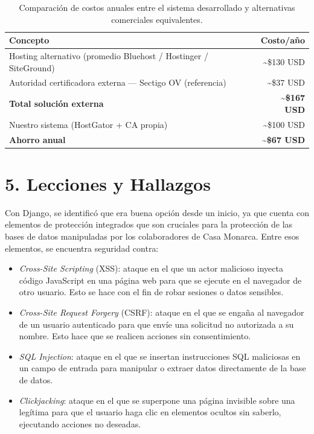 \documentclass[10pt,letterpaper]{report}
\begin{document}
\begin{table}[H]
\centering
\small
\begin{tabularx}{\textwidth}{Xr}
\toprule
\textbf{Concepto} & \textbf{Costo/año} \\
\midrule
Hosting alternativo (promedio Bluehost / Hostinger / SiteGround) & \textasciitilde\$130 USD \\
Autoridad certificadora externa — Sectigo OV (referencia)        & \textasciitilde\$37 USD \\
\textbf{Total solución externa}                                   & \textbf{\textasciitilde\$167 USD} \\
Nuestro sistema (HostGator + CA propia)                          & \textasciitilde\$100 USD \\
\textbf{Ahorro anual}                                            & \textbf{\textasciitilde\$67 USD} \\
\bottomrule
\end{tabularx}
\caption{Comparación de costos anuales entre el sistema desarrollado y alternativas comerciales equivalentes.}
\end{table}

\section*{5. Lecciones y Hallazgos}
 
Con Django, se identificó que era buena opción desde un inicio, ya que cuenta con elementos de protección integrados que son cruciales para la protección de las bases de datos manipuladas por los colaboradores de Casa Monarca. Entre esos elementos, se encuentra seguridad contra:

\begin{itemize}[leftmargin=*]
    \item \textit{Cross-Site Scripting} (XSS): ataque en el que un actor malicioso inyecta código JavaScript en una página web para que se ejecute en el navegador de otro usuario. Esto se hace con el fin de robar sesiones o datos sensibles.
    \item \textit{Cross-Site Request Forgery} (CSRF): ataque en el que se engaña al navegador de un usuario autenticado para que envíe una solicitud no autorizada a su nombre. Esto hace que se realicen acciones sin consentimiento.
    \item \textit{SQL Injection}: ataque en el que se insertan instrucciones SQL maliciosas en un campo de entrada para manipular o extraer datos directamente de la base de datos.
    \item \textit{Clickjacking}: ataque en el que se superpone una página invisible sobre una legítima para que el usuario haga clic en elementos ocultos sin saberlo, ejecutando acciones no deseadas.
\end{itemize}
\end{document}
